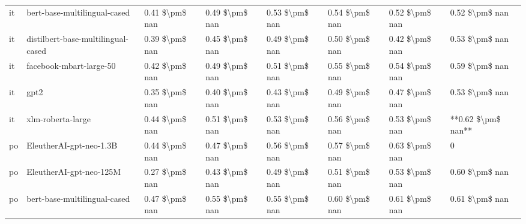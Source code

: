 \begin{tabular}{llllllll}
      it &       bert-base-multilingual-cased & 0.41 \$\textbackslash pm\$ nan &            0.49 \$\textbackslash pm\$ nan &        0.53 \$\textbackslash pm\$ nan &         0.54 \$\textbackslash pm\$ nan &                          0.52 \$\textbackslash pm\$ nan &     0.52 \$\textbackslash pm\$ nan \\
      it & distilbert-base-multilingual-cased & 0.39 \$\textbackslash pm\$ nan &            0.45 \$\textbackslash pm\$ nan &        0.49 \$\textbackslash pm\$ nan &         0.50 \$\textbackslash pm\$ nan &                          0.42 \$\textbackslash pm\$ nan &     0.53 \$\textbackslash pm\$ nan \\
      it &            facebook-mbart-large-50 & 0.42 \$\textbackslash pm\$ nan &            0.49 \$\textbackslash pm\$ nan &        0.51 \$\textbackslash pm\$ nan &         0.55 \$\textbackslash pm\$ nan &                          0.54 \$\textbackslash pm\$ nan &     0.59 \$\textbackslash pm\$ nan \\
      it &                               gpt2 & 0.35 \$\textbackslash pm\$ nan &            0.40 \$\textbackslash pm\$ nan &        0.43 \$\textbackslash pm\$ nan &         0.49 \$\textbackslash pm\$ nan &                          0.47 \$\textbackslash pm\$ nan &     0.53 \$\textbackslash pm\$ nan \\
      it &                  xlm-roberta-large & 0.44 \$\textbackslash pm\$ nan &            0.51 \$\textbackslash pm\$ nan &        0.53 \$\textbackslash pm\$ nan &         0.56 \$\textbackslash pm\$ nan &                          0.53 \$\textbackslash pm\$ nan & **0.62 \$\textbackslash pm\$ nan** \\
      po &            EleutherAI-gpt-neo-1.3B & 0.44 \$\textbackslash pm\$ nan &            0.47 \$\textbackslash pm\$ nan &        0.56 \$\textbackslash pm\$ nan &         0.57 \$\textbackslash pm\$ nan &                          0.63 \$\textbackslash pm\$ nan &                  0 \\
      po &            EleutherAI-gpt-neo-125M & 0.27 \$\textbackslash pm\$ nan &            0.43 \$\textbackslash pm\$ nan &        0.49 \$\textbackslash pm\$ nan &         0.51 \$\textbackslash pm\$ nan &                          0.53 \$\textbackslash pm\$ nan &     0.60 \$\textbackslash pm\$ nan \\
      po &       bert-base-multilingual-cased & 0.47 \$\textbackslash pm\$ nan &            0.55 \$\textbackslash pm\$ nan &        0.55 \$\textbackslash pm\$ nan &         0.60 \$\textbackslash pm\$ nan &                          0.61 \$\textbackslash pm\$ nan &     0.61 \$\textbackslash pm\$ nan \\

\end{tabular}
